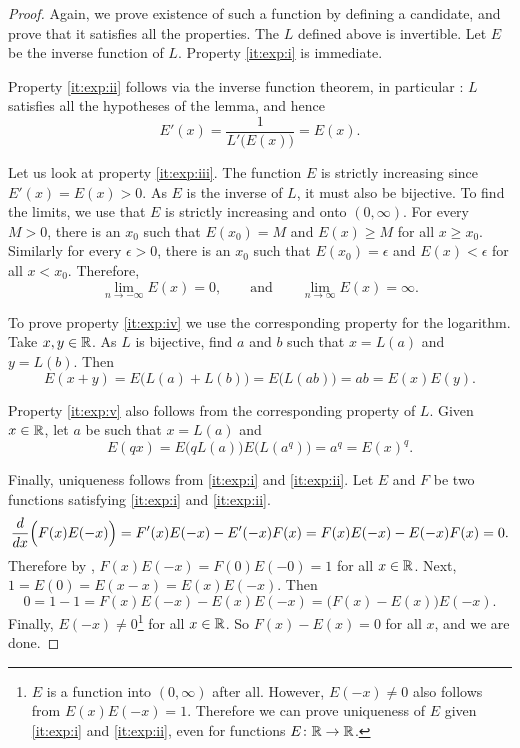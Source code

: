\begin{proof}
Again, we prove existence of such a function by defining a candidate,
and prove that it satisfies all the properties.
The $L$ defined above is invertible.  Let $E$ be the
inverse function of $L$.  Property \ref{it:exp:i} is immediate.

Property \ref{it:exp:ii} follows
via the inverse function theorem, in particular
:  $L$ satisfies
all the hypotheses of the lemma, and hence
\begin{equation*}
E'(x) = \frac{1}{L'\bigl(E(x)\bigr)} = E(x) .
\end{equation*}

Let us look at property \ref{it:exp:iii}.
The function $E$ is strictly increasing since 
$E'(x) = E(x) > 0$.  As $E$ is the inverse of $L$, it must also
be bijective.  
To find the limits, we use that 
$E$ is strictly increasing and onto $(0,\infty)$.
For every $M > 0$, there is an $x_0$ such that
$E(x_0) = M$ and $E(x) \geq M$ for all $x \geq x_0$.
Similarly for every $\epsilon > 0$, there is
an $x_0$ such that $E(x_0) = \epsilon$ and
$E(x) < \epsilon$ for all $x < x_0$.
Therefore,
\begin{equation*}
\lim_{n\to -\infty} E(x) = 0 , \qquad \text{and} \qquad
\lim_{n\to \infty} E(x) = \infty .
\end{equation*}

To prove property \ref{it:exp:iv} we use the corresponding
property for the logarithm.
Take $x, y \in {\mathbb{R}}$.
As $L$ is bijective, find $a$ and $b$ such that $x = L(a)$ and $y = L(b)$.  Then
\begin{equation*}
E(x+y) =
E\bigl(L(a)+L(b)\bigr) = 
E\bigl(L(ab)\bigr) = ab = E(x)E(y)  .
\end{equation*}

Property \ref{it:exp:v} also follows from the corresponding property of $L$.
Given $x \in {\mathbb{R}}$, let $a$ be such that $x = L(a)$ and
\begin{equation*}
E(qx) = E\bigl(qL(a)\bigr)
E\bigl(L(a^q)\bigr) = a^q = {E(x)}^q .
\end{equation*}

Finally, uniqueness follows from
\ref{it:exp:i} and
\ref{it:exp:ii}.
Let $E$ and $F$
be two functions satisfying
\ref{it:exp:i} and \ref{it:exp:ii}.  
\begin{equation*}
\frac{d}{dx} \Bigl( F(x)E(-x) \Bigr)
=
F'(x)E(-x) - E'(-x)F(x)
=
F(x)E(-x) - E(-x)F(x) = 0 .
\end{equation*}
Therefore by ,
$F(x)E(-x) = F(0)E(-0) = 1$ for all $x \in {\mathbb{R}}$.
Next, $1 = E(0) = E(x-x) = E(x)E(-x)$.
Then
\begin{equation*}
0 = 1-1 = F(x)E(-x) - E(x)E(-x) = \bigl(F(x)-E(x)\bigr) E(-x) .
\end{equation*}
Finally, $E(-x) \not= 0$\footnote{%
$E$ is a function into $(0,\infty)$ after all.
However, $E(-x) \neq 0$ also follows
from $E(x)E(-x) = 1$.  Therefore we can prove uniqueness of $E$ 
given \ref{it:exp:i} and \ref{it:exp:ii}, even for functions $E \colon {\mathbb{R}}
\to {\mathbb{R}}$.}
for all $x \in {\mathbb{R}}$.
So
$F(x)-E(x) = 0$ for all $x$, and we are done.
\end{proof}

